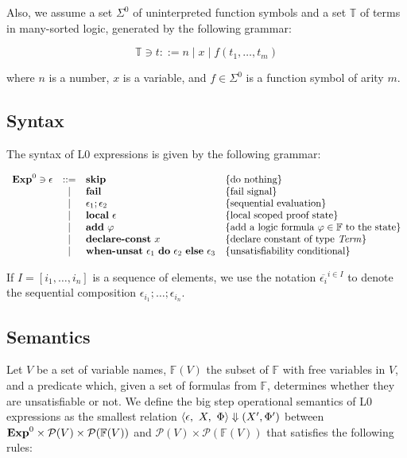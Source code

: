 Also, we assume a set $\Sigma^{0}$ of uninterpreted function symbols and a set
$\mathbb{T}$ of terms in many-sorted logic, generated by the following grammar:

\[
\mathbb{T} \ni t ::= n \mid x \mid f(t_1, \ldots, t_m)
\]

where $n$ is a number, $x$ is a variable, and $f \in \Sigma^{0}$ is a function 
symbol of arity $m$.

\subsection{Syntax}

The syntax of L0 expressions is given by the following grammar:

\[
\begin{array}{rcll}
\mathbf{Exp}^{0} \ni \epsilon & ::= & \textbf{skip} & \{ \textrm{do nothing} \}\\
& | & \textbf{fail} & \{ \textrm{fail signal} \}\\
& | & \epsilon_1;\epsilon_2 & \{ \textrm{sequential evaluation} \}\\
& | & \textbf{local}~\epsilon & \{ \textrm{local scoped proof state} \}\\
& | & \textbf{add}~\varphi &  \{ \textrm{add a logic formula $\varphi \in \mathbb{F}$ to the state} \}\\
& | & \textbf{declare-const}~x &  \{ \textrm{declare constant of type $\mathit{Term}$} \}\\
& | & \textbf{when-unsat}~\epsilon_1~\textbf{do}~\epsilon_2~\textbf{else}~\epsilon_3 &  \{ \textrm{unsatisfiability conditional} \}\\
\end{array}
\]

If $I = [i_1, \ldots, i_n]$ is a sequence of elements, we use the notation
$\overline{\epsilon_i}^{i \in I}$ to denote the sequential composition 
$\epsilon_{i_1};\dots;\epsilon_{i_n}$.

\subsection{Semantics}

Let $V$ be a set of variable names, $\mathbb{F}(V)$ the subset of $\mathbb{F}$ 
with free variables in $V$, and a predicate \unsat{\_} which, given a set of 
formulas from $\mathbb{F}$, determines whether they are unsatisfiable or not. 
We define the big step operational semantics of L0 expressions as the smallest 
relation $\langle \epsilon,~X,~\Phi\rangle \Downarrow (X', \Phi')$ between $\mathbf{Exp}^{0} \times 
\mathcal{P}(V) \times \mathcal{P}({\mathbb{F}(V)})$ and 
$\mathcal{P}(V) \times \mathcal{P}({\mathbb{F}(V)})$ that satisfies the following 
rules:

